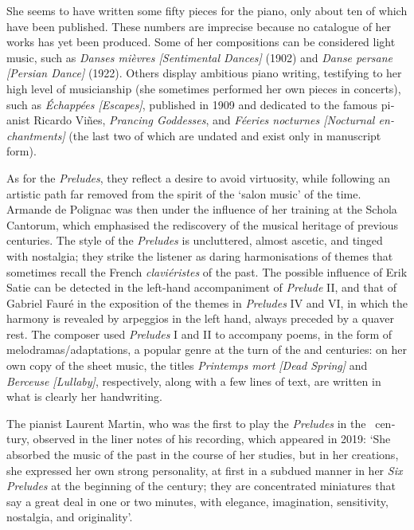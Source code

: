 \documentclass[a4paper, 12pt]{book}
\begin{document}
\begin{otherlanguage}{english}
She seems to have written some fifty pieces for the piano, only about
ten of which have been published.
These numbers are imprecise because no catalogue of her works
has yet been produced. Some of her compositions can be considered light
music, such as \emph{Danses mièvres [Sentimental Dances]} (1902) and
\emph{Danse persane [Persian Dance]} (1922). Others display ambitious
piano writing, testifying to her high level of musicianship (she
sometimes performed her own pieces in concerts), such as
\emph{Échappées [Escapes]}, published in 1909 and dedicated to the
famous pianist Ricardo Viñes, \emph{Prancing Goddesses}, and
\emph{Féeries nocturnes [Nocturnal enchantments]} (the last two of
which are undated and exist only in manuscript form).

As for the \emph{Preludes}, they reflect a desire to avoid virtuosity,
while following an artistic path far removed from the spirit of the
`salon music' of the time. Armande de Polignac was then under the
influence of her training at the Schola Cantorum, which emphasised the
rediscovery of the musical heritage of previous centuries. The style
of the \emph{Preludes} is uncluttered, almost ascetic, and tinged with
nostalgia; they strike the listener as daring harmonisations of themes
that sometimes recall the French \emph{claviéristes} of the past. The
possible influence of Erik Satie can be detected in the left-hand
accompaniment of \emph{Prelude} II, and that of Gabriel Fauré in the
exposition of the themes in \emph{Preludes} IV and VI, in which the
harmony is revealed by arpeggios in the left hand, always preceded by
a quaver rest. The composer used \emph{Preludes} I and II to accompany
poems, in the form of melodramas/adaptations, a popular genre at the
turn of the  and  centuries: on her own copy of the
sheet music, the titles \emph{Printemps mort [Dead Spring]} and
\emph{Berceuse [Lullaby]}, respectively, along with a few lines of
text, are written in what is clearly her handwriting.

The pianist Laurent Martin, who was the first to play the
\emph{Preludes} in the ~century, observed in the liner notes
of his recording, which appeared in 2019: `She absorbed the music of
the past in the course of her studies, but in her creations, she
expressed her own strong personality, at first in a subdued manner in
her \emph{Six Preludes} at the beginning of the  century; they
are concentrated miniatures that say a great deal in one or two
minutes, with elegance, imagination, sensitivity, nostalgia, and
originality'.


\end{otherlanguage}
\end{document}
